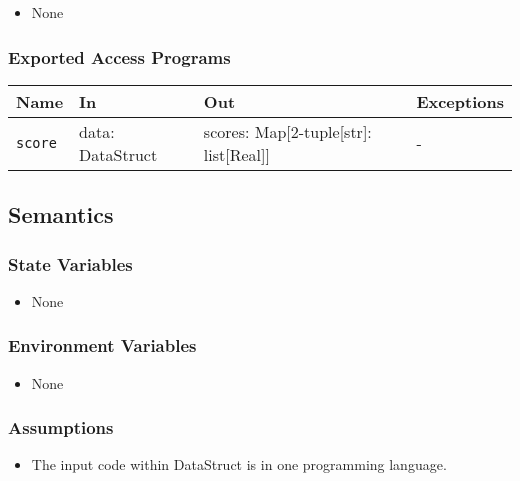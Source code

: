 \documentclass[12pt, titlepage]{article}
\begin{document}
\begin{itemize}
    \item None
\end{itemize}

\subsubsection{Exported Access Programs}

\begin{center}
\begin{tabular}{p{5cm} p{3.5cm} p{3.5cm} p{2cm}}
\hline
\textbf{Name} & \textbf{In} & \textbf{Out} & \textbf{Exceptions} \\
\hline
\texttt{score} & data: DataStruct & scores: Map[2-tuple[str]: list[Real]] & -\\ %
\hline
\end{tabular}
\end{center}

\subsection{Semantics}

\subsubsection{State Variables}

\begin{itemize}
    \item None
\end{itemize}

\subsubsection{Environment Variables}

\begin{itemize}
  \item None
\end{itemize}

\subsubsection{Assumptions}

\begin{itemize}
    \item The input code within DataStruct is in one programming language.
\end{itemize}
\end{document}
